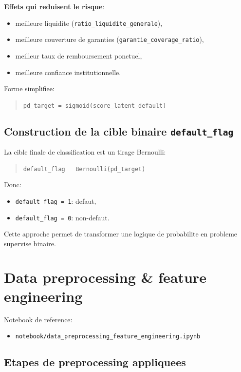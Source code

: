 \documentclass[11pt,a4paper]{article}
\begin{document}
\textbf{Effets qui reduisent le risque}:
\begin{itemize}[leftmargin=1.2cm]
  \item meilleure liquidite (\texttt{ratio\_liquidite\_generale}),
  \item meilleure couverture de garanties (\texttt{garantie\_coverage\_ratio}),
  \item meilleur taux de remboursement ponctuel,
  \item meilleure confiance institutionnelle.
\end{itemize}

Forme simplifiee:
\begin{quote}
\texttt{pd\_target = sigmoid(score\_latent\_default)}
\end{quote}

\subsection{Construction de la cible binaire \texttt{default\_flag}}

La cible finale de classification est un tirage Bernoulli:
\begin{quote}
\texttt{default\_flag ~ Bernoulli(pd\_target)}
\end{quote}

Donc:
\begin{itemize}[leftmargin=1.2cm]
  \item \texttt{default\_flag = 1}: defaut,
  \item \texttt{default\_flag = 0}: non-defaut.
\end{itemize}

Cette approche permet de transformer une logique de probabilite en probleme supervise binaire.

\section{Data preprocessing \& feature engineering}

Notebook de reference:
\begin{itemize}[leftmargin=1.2cm]
  \item \texttt{notebook/data\_preprocessing\_feature\_engineering.ipynb}
\end{itemize}

\subsection{Etapes de preprocessing appliquees}
\end{document}
